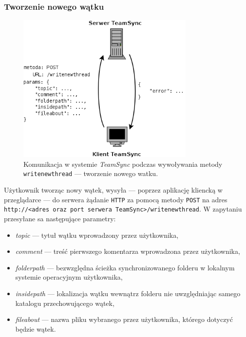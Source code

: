 \documentclass[polish,a4paper,twoside]{ppfcmthesis}
\begin{document}
\subsubsection*{Tworzenie nowego wątku}

\begin{figure}[h!]
  \vspace{5pt}
  \begin{center}
    \includegraphics[width=250pt]{figures/metwritenewthread.png}
  \end{center}
  \caption{Komunikacja w systemie \emph{TeamSync} podczas wywoływania metody \texttt{writenewthread} --- tworzenie nowego watku.}
  \label{picmetdeletefolder}
\end{figure}

Użytkownik tworząc nowy wątek, wysyła --- poprzez aplikację kliencką w przeglądarce --- do serwera żądanie \texttt{HTTP} za pomocą metody \texttt{POST} na adres \texttt{http://<adres oraz port\- serwera TeamSync>/\-writenewthread}. W zapytaniu przesyłane sa następujące parametry:

\begin{itemize}[noitemsep]
  \item \emph{topic} --- tytuł wątku wprowadzony przez użytkownika,
  
  \item \emph{comment} --- treść pierwszego komentarza wprowadzona przez użytkownika,
  
  \item \emph{folderpath} --- bezwzględna ścieżka synchronizowanego folderu w lokalnym systemie operacyjnym użytkownika,
  
  \item \emph{insidepath} --- lokalizacja wątku wewnątrz folderu nie uwzględniając samego katalogu przechowującego wątek,
  
  \item \emph{fileabout} --- nazwa pliku wybranego przez użytkownika, którego dotyczyć będzie wątek.
\end{itemize}
\end{document}
